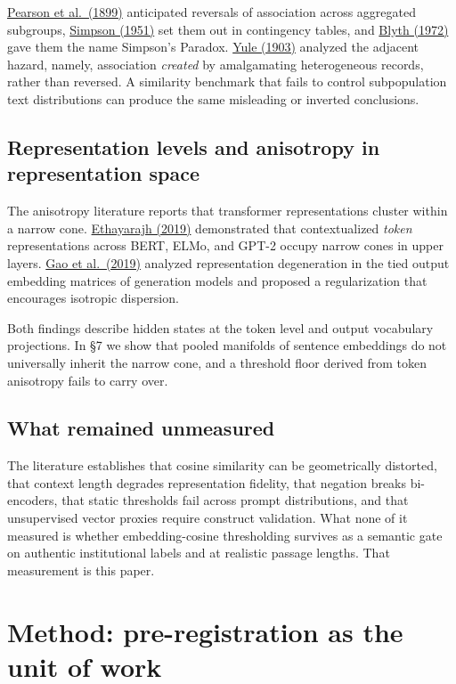\documentclass[11pt]{article}
\begin{document}
\hyperlink{bib:pearson}{Pearson et al.\ (1899)} anticipated reversals of association across aggregated subgroups, \hyperlink{bib:simpson}{Simpson (1951)} set them out in contingency tables, and \hyperlink{bib:blyth}{Blyth (1972)} gave them the name Simpson's Paradox. \hyperlink{bib:yule}{Yule (1903)} analyzed the adjacent hazard, namely, association \emph{created} by amalgamating heterogeneous records, rather than reversed. A similarity benchmark that fails to control subpopulation text distributions can produce the same misleading or inverted conclusions.

\subsection{Representation levels and anisotropy in representation space}

The anisotropy literature reports that transformer representations cluster within a narrow cone. \hyperlink{bib:ethayarajh}{Ethayarajh (2019)} demonstrated that contextualized \emph{token} representations across BERT, ELMo, and GPT-2 occupy narrow cones in upper layers. \hyperlink{bib:gao}{Gao et al.\ (2019)} analyzed representation degeneration in the tied output embedding matrices of generation models and proposed a regularization that encourages isotropic dispersion.

Both findings describe hidden states at the token level and output vocabulary projections. In \S7 we show that pooled manifolds of sentence embeddings do not universally inherit the narrow cone, and a threshold floor derived from token anisotropy fails to carry over.

\subsection{What remained unmeasured}

The literature establishes that cosine similarity can be geometrically distorted, that context length degrades representation fidelity, that negation breaks bi-encoders, that static thresholds fail across prompt distributions, and that unsupervised vector proxies require construct validation. What none of it measured is whether embedding-cosine thresholding survives as a semantic gate on authentic institutional labels and at realistic passage lengths. That measurement is this paper.

\section{Method: pre-registration as the unit of work}
\end{document}
